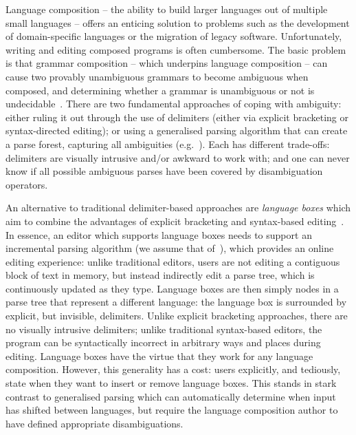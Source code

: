 \documentclass[sigplan,screen]{acmart}\settopmatter{printfolios=true,printccs=false,printacmref=false}
\begin{document}
Language composition -- the ability to build larger languages out of multiple
small languages -- offers an enticing solution to problems such as the
development of domain-specific languages or the migration of legacy software.
Unfortunately, writing and editing composed programs is often cumbersome.
The basic problem is that grammar
composition -- which underpins language composition -- can cause
two provably unambiguous grammars to become ambiguous when composed,
and determining whether a grammar is unambiguous or not is
undecidable~\cite{cantor62ambiguity}. There are two fundamental approaches
of coping with ambiguity: either ruling it out through the use of
delimiters (either via explicit bracketing or syntax-directed
editing); or using a generalised parsing algorithm that can create a parse
forest, capturing all ambiguities
(e.g.~\cite{visser97scannerless}). Each has different trade-offs: delimiters
are visually intrusive and/or awkward to work with; and one can never know if all possible
ambiguous parses have been covered by disambiguation operators.

An alternative to traditional delimiter-based approaches are \emph{language boxes} which aim to
combine the advantages of explicit bracketing and syntax-based
editing~\cite{diekmann14eco}. In essence, an editor
which supports language boxes needs to support an incremental parsing algorithm
(we assume that of~\citet{wagner98practicalalgorithms}), which provides an
online editing experience: unlike traditional editors, users are not editing
a contiguous block of text in memory, but instead
indirectly edit a parse tree, which is continuously updated as they type.
Language boxes are then simply nodes in a parse
tree that represent a different language: the language box is surrounded by
explicit, but invisible, delimiters. Unlike explicit bracketing approaches,
there are no visually intrusive delimiters; unlike traditional
syntax-based editors, the program can be syntactically incorrect in arbitrary
ways and places during editing. Language boxes have the virtue that they
work for any language composition. However, this generality has a cost:
users explicitly, and tediously, state when they want
to insert or remove language boxes. This stands in stark contrast to
generalised parsing which can automatically determine when input
has shifted between languages, but require the language composition author
to have defined appropriate disambiguations.
\end{document}
